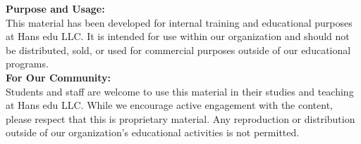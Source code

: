 \newcommand{\BookAuthor}{Jaehoon Song (Lecturer)}

\begin{center}
  \begin{minipage}{0.85\textwidth}
    {\small\textbf{Purpose and Usage:}}\\[0.2cm]
    {\footnotesize
    This material has been developed for internal training and educational 
    purposes at Hans edu LLC. It is intended for use within our organization 
    and should not be distributed, sold, or used for commercial purposes 
    outside of our educational programs.}\\[0.5cm]
    
    {\small\textbf{For Our Community:}}\\[0.2cm]
    {\footnotesize
    Students and staff are welcome to use this material in their studies and 
    teaching at Hans edu LLC. While we encourage active engagement with the 
    content, please respect that this is proprietary material. Any 
    reproduction or distribution outside of our organization's educational 
    activities is not permitted.}\\[0.5cm]
    

\end{minipage}
\end{center}
